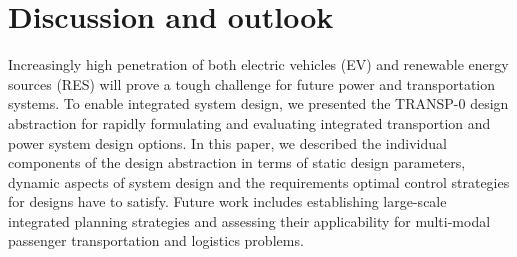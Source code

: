 \section{Discussion and outlook}
\label{conclusion}

Increasingly high penetration of both electric vehicles (EV) and renewable energy sources (RES) will prove a tough challenge for future power and transportation systems. To enable integrated system design, we presented the TRANSP-0 design abstraction for rapidly formulating and evaluating integrated transportion and power system design options. In this paper, we described the individual components of the design abstraction in terms of static design parameters, dynamic aspects of system design and the requirements optimal control strategies for designs have to satisfy.
Future work includes establishing large-scale integrated planning strategies and assessing their applicability for multi-modal passenger transportation and logistics problems.

